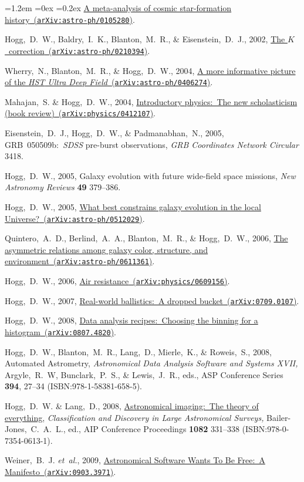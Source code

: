 \documentclass[10pt,letterpaper]{article}
\newcommand{\acronym}[1]{{\small{#1}}}
\newcommand{\foreign}[1]{\textsl{#1}}
\newcommand{\etal}{\foreign{et~al.}}
\newcommand{\project}[1]{\textsl{#1}}
\newcommand{\doi}[2]{\href{http://dx.doi.org/#1}{{#2}}}
\newcommand{\isbn}[1]{{\footnotesize(\acronym{ISBN:}{#1})}}
\newcommand{\arxiv}[2]{\href{http://arxiv.org/abs/#1}{{#2}\ (\texttt{arXiv:#1})}}
\newcounter{refpubnum}
\newcommand{\hogglist}{%
    \rightmargin=0in
    \leftmargin=1.2em
    \topsep=0ex
    \partopsep=0pt
    \itemsep=0.2ex
    \parsep=0pt
    \itemindent=-1.0\leftmargin
    \listparindent=0.0\leftmargin
    \settowidth{\labelsep}{~}
    \usecounter{refpubnum}
  }
\begin{document}
\begin{list}{}{\hogglist}
\arxiv{astro-ph/0105280}{A meta-analysis of cosmic star-formation history}.
\item
Hogg,~D.~W., Baldry,~I.~K., Blanton,~M.~R., \& Eisenstein,~D.~J., 2002,
\arxiv{astro-ph/0210394}{The $K$~correction}.
\item
Wherry,~N., Blanton,~M.~R., \& Hogg,~D.~W., 2004,
\arxiv{astro-ph/0406274}{A more informative picture of the \project{\acronym{HST} Ultra Deep Field}}.
\item
Mahajan,~S. \& Hogg,~D.~W., 2004,
\arxiv{physics/0412107}{Introductory physics:\ The new scholasticism (book review)}.
\item
Eisenstein,~D.~J., Hogg,~D.~W., \& Padmanabhan,~N., 2005,
{\acronym{GRB}~050509b:\ \project{\acronym{SDSS}} pre-burst observations},
\textit{\acronym{GRB} Coordinates Network Circular} 3418.
\item
Hogg,~D.~W., 2005,
{Galaxy evolution with future wide-field space missions},
\textit{New Astronomy Reviews} \textbf{49} 379--386.
\item
Hogg,~D.~W., 2005,
\arxiv{astro-ph/0512029}{What best constrains galaxy evolution in the local Universe?}.
\item
Quintero,~A.~D., Berlind,~A.~A., Blanton,~M.~R., \& Hogg,~D.~W., 2006,
\arxiv{astro-ph/0611361}{The asymmetric relations among galaxy color, structure, and environment}.
\item
Hogg,~D.~W., 2006,
\arxiv{physics/0609156}{Air resistance}.
\item
Hogg,~D.~W., 2007,
\arxiv{0709.0107}{Real-world ballistics:\ A dropped bucket}.
\item
Hogg,~D.~W., 2008,
\arxiv{0807.4820}{Data analysis recipes:\ Choosing the binning for a histogram}.
\item
Hogg,~D.~W., Blanton,~M.~R., Lang,~D., Mierle,~K., \& Roweis,~S., 2008,
{Automated Astrometry},
\textit{Astronomical Data Analysis
Software and Systems XVII,} Argyle,~R.~W, Bunclark,~P.~S., \&
Lewis,~J.~R., eds., ASP Conference Series \textbf{394}, 27--34
\isbn{978-1-58381-658-5}.
\item
Hogg,~D.~W. \& Lang,~D., 2008,
\doi{10.1063/1.3059072}{Astronomical imaging:\ The theory of everything},
\textit{Classification and Discovery in Large Astronomical
Surveys,} Bailer-Jones,~C.~A.~L., ed., AIP Conference Proceedings
\textbf{1082} 331--338 \isbn{978-0-7354-0613-1}.
\item
Weiner,~B.~J. \etal, 2009,
\arxiv{0903.3971}{Astronomical Software Wants To Be Free:\ A Manifesto}.
\item

\end{list}
\end{document}
